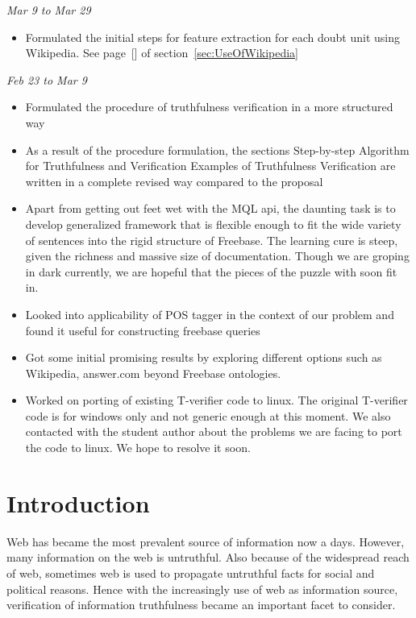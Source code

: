 \documentclass[11pt]{article}
\begin{document}
{\em Mar 9 to Mar 29}
\begin{itemize}
\item Formulated the initial steps for feature extraction for each doubt unit using Wikipedia. See page~[\pageref{March9to29}] of section~\ref{sec:UseOfWikipedia}
\end{itemize} 
{\em Feb 23 to Mar 9} 
\begin{itemize}
\item Formulated the procedure of truthfulness verification in a more structured way
\item As a result of the procedure formulation, the sections Step-by-step Algorithm for Truthfulness and Verification Examples of Truthfulness Verification are written in a complete revised way compared to the proposal
\item Apart from getting out feet wet with the MQL api, the daunting task is to develop generalized framework that is flexible enough to fit the wide variety of sentences into the rigid structure of Freebase. The learning cure is steep, given the richness and massive size of documentation. Though we are groping in dark currently, we are hopeful that the pieces of the puzzle with soon fit in.
\item Looked into applicability of POS tagger in the context of our problem and found it useful for constructing freebase queries
\item Got some initial promising results by exploring different options such as Wikipedia, answer.com beyond Freebase ontologies. 
\item Worked on porting of existing T-verifier code to linux. The original T-verifier code is for windows only and not generic enough at this moment. We also contacted with the student author about the problems we are facing to port the code to linux. We hope to resolve it soon.
\end{itemize}


\section{Introduction}
Web has became the most prevalent source of information now a days. However, many
information on the web is untruthful. Also because of the widespread reach of
web, sometimes web is used to propagate untruthful facts for social and political
reasons. Hence with the increasingly use of web as information source,
verification of information truthfulness became an important facet to consider.
\end{document}
